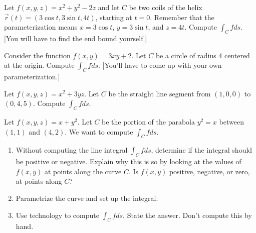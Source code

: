 \begin{problem}%
 Let $f(x,y,z)=x^2+y^2-2z$ and let $C$ be two coils of the helix $\vec r(t)=(3\cos t, 3\sin t, 4t)$, starting at $t=0$. Remember that the parameterization means $x=3\cos t$, $y=3\sin t$, and $z=4t$.  Compute  $\int_Cf ds$. [You will have to find the end bound yourself.]
\end{problem}

\begin{problem}%
 Consider the function $f(x,y)=3xy+2$. Let $C$ be a circle of radius 4 centered at the origin.  Compute $\int_C fds$.  [You'll have to come up with your own parameterization.]
\end{problem}


\begin{problem}%
 Let $f(x,y,z)=x^2+3yz$. Let $C$ be the straight line segment from $(1,0,0)$ to $(0,4,5)$. Compute $\int_C f ds$. 
\end{problem}

\begin{problem}
 Let $f(x,y,z)=x+y^2$. Let $C$ be the portion of the parabola $y^2=x$ between $(1,1)$ and $(4,2)$. We want to compute $\int_C fds$.  
\begin{enumerate}
 \item Without computing the line integral $\int_C fds$, determine if the integral should be positive or negative. Explain why this is so by looking at the values of $f(x,y)$ at points along the curve $C$.  Is $f(x,y)$ positive, negative, or zero, at points along $C$?
 \item Parametrize the curve and set up the integral.
 \item Use technology to compute $\int_C fds$. State the answer. Don't compute this by hand.
\end{enumerate}
\end{problem}

